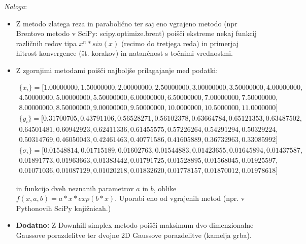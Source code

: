 \documentclass[12pt]{article}
\begin{document}
\emph{Naloga}:
\begin{itemize}
\item Z metodo zlatega reza in parabolično ter saj eno vgrajeno metodo (npr  Brentovo metodo v SciPy: scipy.optimize.brent)
  poišči ekstreme nekaj funkcij različnih redov tipa $x^n*sin(x)$ (recimo do
  tretjega reda) in primerjaj hitrost konvergence (št. korakov) in natančnost s točnimi vrednostmi.
\item Z zgornjimi metodami poišči najboljše prilagajanje med podatki:

\begin{equation*}
\begin{split}
\{x_i\} = [1.00000000, 1.50000000, 2.00000000, 2.50000000, 3.00000000, 3.50000000, 4.00000000, \\
           4.50000000, 5.00000000, 5.50000000, 6.00000000, 6.50000000, 7.00000000, 7.50000000, \\
           8.00000000, 8.50000000, 9.00000000, 9.50000000, 10.0000000, 10.5000000, 11.0000000]
\end{split}
\end{equation*}
\begin{equation*}
\begin{split}
\{y_i\} = [0.31700705, 0.43791106, 0.56528271, 0.56102378, 0.63664784, 0.65121353, 0.63487502, \\
           0.64501481, 0.60942923, 0.62411336, 0.61455575, 0.57226264, 0.54291294, 0.50329224, \\
           0.50314769, 0.46050043, 0.42461463, 0.40771586, 0.41605889, 0.36732963, 0.33085992]
\end{split}
\end{equation*}
\begin{equation*}
\begin{split}
\{\sigma_i\} = [0.01548814, 0.01715189, 0.01602763, 0.01544883, 0.01423655, 0.01645894, 0.01437587, \\
                0.01891773, 0.01963663, 0.01383442, 0.01791725, 0.01528895, 0.01568045, 0.01925597, \\
                0.01071036, 0.01087129, 0.01020218, 0.01832620, 0.01778157, 0.01870012, 0.01978618]
\end{split}
\end{equation*}


 in funkcijo dveh neznanih parametrov $a$ in $b$, oblike $f(x,a,b)=a*x*exp(b*x)$. Uporabi eno od vgrajenih metod (npr. v Pythonovih SciPy knjižnicah.)
\item {\bf Dodatno:} Z Downhill simplex metodo poišči maksimum dvo-dimenzionalne Gaussove porazdelitve ter dvojne 2D Gaussove
  porazdelitve (kamelja grba).
\end{itemize}

\clearpage
\end{document}
